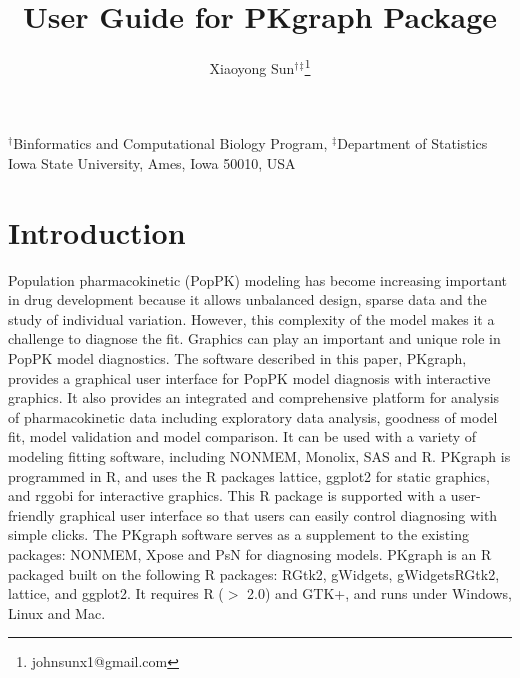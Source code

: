 \documentclass[a4paper]{article}
\author{Xiaoyong Sun$^\dagger$$^\ddagger$\footnote{johnsunx1@gmail.com}}
\begin{document}

\title{User Guide for PKgraph Package}
\maketitle
\begin{center}$^\dagger$Binformatics and Computational Biology Program, $^\ddagger$Department of Statistics \\ Iowa State University, Ames, Iowa 50010, USA
\end{center}

\tableofcontents

\section{Introduction}
Population pharmacokinetic (PopPK) modeling has become increasing important in
drug development because it allows unbalanced design, sparse data and the study
of individual variation. However, this complexity of the model makes it a challenge
to diagnose the fit.  Graphics can play an important and unique role in PopPK model diagnostics.
The software described in this paper, PKgraph, provides a graphical user interface for
PopPK model diagnosis with interactive graphics. It also provides an integrated and comprehensive platform for analysis
of pharmacokinetic data including exploratory data analysis, goodness of model fit,
model validation and model comparison. It can be used with a variety of modeling fitting software,
including NONMEM, Monolix, SAS and R. PKgraph is programmed in R, and uses the R packages
lattice, ggplot2 for static graphics, and rggobi for interactive graphics. This R package is
supported with a user-friendly graphical user interface so that users can easily control diagnosing
with simple clicks. The PKgraph software serves as a supplement to the existing packages:
NONMEM, Xpose and PsN for diagnosing models.
\newline
\newline
PKgraph is an R packaged built on the following R packages: RGtk2, gWidgets, gWidgetsRGtk2,
lattice, and ggplot2. It requires R ($>$ 2.0) and  GTK+, and runs under Windows, Linux and Mac.
\end{document}
